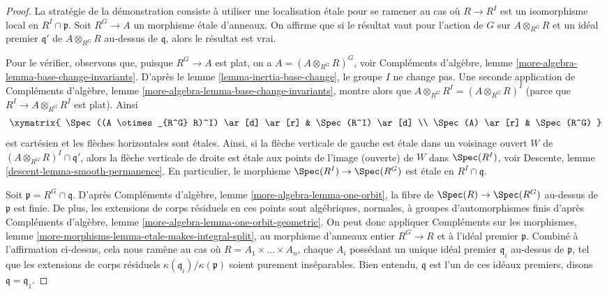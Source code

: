 \begin{proof}
La stratégie de la démonstration consiste à utiliser une localisation étale pour
se ramener au cas où $R \to R^I$ est un isomorphisme local en
$R^I \cap \mathfrak p$.
Soit $R^G \to A$ un morphisme étale d'anneaux. On affirme que si le résultat
vaut pour l'action de $G$ sur $A \otimes_{R^G} R$ et un idéal premier
$\mathfrak q'$ de $A \otimes_{R^G} R$ au-dessus de $\mathfrak q$, alors
le résultat est vrai.

\medskip\noindent
Pour le vérifier, observons que, puisque $R^G \to A$ est plat, on a
$A = (A \otimes_{R^G} R)^G$, voir Compléments d'algèbre,
lemme \ref{more-algebra-lemma-base-change-invariants}.
D'après le lemme \ref{lemma-inertia-base-change}, le groupe $I$ ne change pas.
Une seconde application de Compléments d'algèbre,
lemme \ref{more-algebra-lemma-base-change-invariants},
montre alors que $A \otimes_{R^G} R^I = (A \otimes_{R^G} R)^I$
(parce que $R^I \to A \otimes_{R^G} R^I$ est plat).
Ainsi
$$
\xymatrix{
\Spec((A \otimes_{R^G} R)^I) \ar[d] \ar[r] & \Spec(R^I) \ar[d] \\
\Spec(A) \ar[r] & \Spec(R^G)
}
$$
est cartésien et les flèches horizontales sont étales. Ainsi, si la
flèche verticale de gauche est étale dans un voisinage ouvert $W$ de
$(A \otimes_{R^G} R)^I \cap \mathfrak q'$, alors la flèche verticale de droite
est étale aux points de l'image (ouverte) de $W$ dans
$\Spec(R^I)$, voir
Descente, lemme \ref{descent-lemma-smooth-permanence}. En particulier,
le morphisme $\Spec(R^I) \to \Spec(R^G)$ est étale en $R^I \cap \mathfrak q$.

\medskip\noindent
Soit $\mathfrak p = R^G \cap \mathfrak q$.
D'après Compléments d'algèbre, lemme \ref{more-algebra-lemma-one-orbit},
la fibre de $\Spec(R) \to \Spec(R^G)$ au-dessus de $\mathfrak p$ est
finie. De plus, les extensions de corps résiduels en ces points
sont algébriques, normales, à groupes d'automorphismes finis d'après
Compléments d'algèbre, lemme \ref{more-algebra-lemma-one-orbit-geometric}.
On peut donc appliquer
Compléments sur les morphismes,
lemme \ref{more-morphisms-lemma-etale-makes-integral-split},
au morphisme d'anneaux entier $R^G \to R$ et à l'idéal premier $\mathfrak p$.
Combiné à l'affirmation ci-dessus, cela nous ramène au cas où
$R = A_1 \times \ldots \times A_n$, chaque $A_i$ possédant un unique
idéal premier $\mathfrak q_i$ au-dessus de $\mathfrak p$, tel que les
extensions de corps résiduels $\kappa(\mathfrak q_i)/\kappa(\mathfrak p)$
soient purement inséparables. Bien entendu, $\mathfrak q$ est l'un de
ces idéaux premiers, disons $\mathfrak q = \mathfrak q_1$.


\end{proof}
